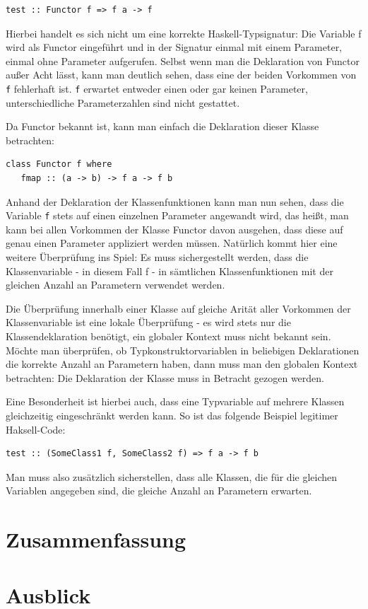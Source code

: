 \documentclass[11pt]{article} %
\begin{document}
\begin{verbatim}
test :: Functor f => f a -> f
\end{verbatim}

Hierbei handelt es sich nicht um eine korrekte Haskell-Typsignatur: Die Variable f wird als Functor eingeführt und in der Signatur
einmal mit einem Parameter, einmal ohne Parameter aufgerufen. Selbst wenn man die Deklaration von Functor außer Acht lässt,
kann man deutlich sehen, dass eine der beiden Vorkommen von \texttt{f} fehlerhaft ist. \texttt{f} erwartet entweder einen
oder gar keinen Parameter, unterschiedliche Parameterzahlen sind nicht gestattet.

Da Functor bekannt ist, kann man einfach die Deklaration dieser Klasse betrachten:

\begin{verbatim}
class Functor f where
   fmap :: (a -> b) -> f a -> f b
\end{verbatim}

Anhand der Deklaration der Klassenfunktionen kann man nun sehen, dass die Variable \texttt{f} stets auf einen einzelnen 
Parameter angewandt wird, das heißt, man kann bei allen Vorkommen der Klasse Functor davon ausgehen, dass diese
auf genau einen Parameter appliziert werden müssen. Natürlich kommt hier eine weitere Überprüfung ins Spiel: Es muss
sichergestellt werden, dass die Klassenvariable - in diesem Fall f - in sämtlichen Klassenfunktionen mit der gleichen Anzahl an
Parametern verwendet werden.

Die Überprüfung innerhalb einer Klasse auf gleiche Arität aller Vorkommen der Klassenvariable ist eine lokale Überprüfung -
es wird stets nur die Klassendeklaration benötigt, ein globaler Kontext muss nicht bekannt sein. Möchte man überprüfen,
ob Typkonstruktorvariablen in beliebigen Deklarationen die korrekte Anzahl an Parametern haben, dann muss man den
globalen Kontext betrachten: Die Deklaration der Klasse muss in Betracht gezogen werden.

Eine Besonderheit ist hierbei auch, dass eine Typvariable auf mehrere Klassen gleichzeitig eingeschränkt werden kann. So ist
das folgende Beispiel legitimer Haksell-Code:

\begin{verbatim}
test :: (SomeClass1 f, SomeClass2 f) => f a -> f b
\end{verbatim}

Man muss also zusätzlich sicherstellen, dass alle Klassen, die für die gleichen Variablen angegeben sind, die gleiche Anzahl an
Parametern erwarten.

\section{Zusammenfassung}

\section{Ausblick}



\end{document}
